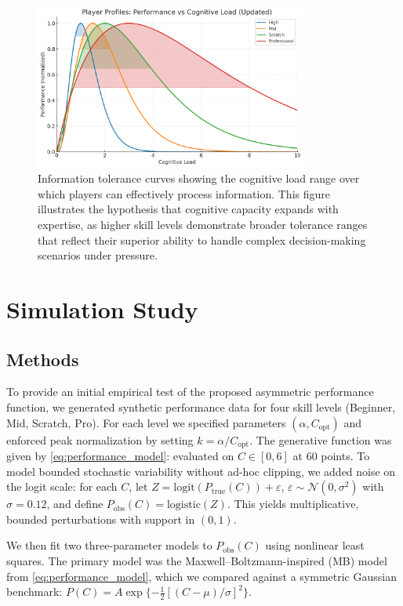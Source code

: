 \documentclass{article}
\begin{document}
\begin{figure}[h]
    \centering
    \includegraphics[width=0.8\textwidth]{figures/information_tolerance.png}
    \caption{Information tolerance curves showing the cognitive load range over which players can effectively
process information. This figure illustrates the hypothesis that cognitive capacity expands with expertise, as 
higher skill levels demonstrate broader tolerance ranges that reflect their superior ability to handle complex 
decision-making scenarios under pressure.}
    \label{fig:information_tolerance}
\end{figure}

\section*{Simulation Study}

\subsection*{Methods}
To provide an initial empirical test of the proposed asymmetric performance function, we generated
synthetic performance data for four skill levels (Beginner, Mid, Scratch, Pro). For each level we
specified parameters $(\alpha, C_{\text{opt}})$ and enforced peak normalization by setting
$k=\alpha/C_{\text{opt}}$. The generative function was given by \cref{eq:performance_model}:
evaluated on $C\in[0,6]$ at 60 points. To model bounded stochastic variability without ad-hoc clipping,
we added noise on the logit scale: for each $C$, let $Z=\mathrm{logit}(P_{\text{true}}(C))+\varepsilon$,
$\varepsilon\sim\mathcal{N}(0,\sigma^2)$ with $\sigma=0.12$, and define
$P_{\text{obs}}(C)=\mathrm{logistic}(Z)$. This yields multiplicative, bounded perturbations with support
in $(0,1)$.

We then fit two three-parameter models to $P_{\text{obs}}(C)$ using nonlinear least squares. The primary model was 
the Maxwell--Boltzmann-inspired (MB) model from \cref{eq:performance_model}, which we compared against a symmetric 
Gaussian benchmark: $P(C)=A\exp\{-\tfrac{1}{2}[(C-\mu)/\sigma]^2\}$.
\end{document}
